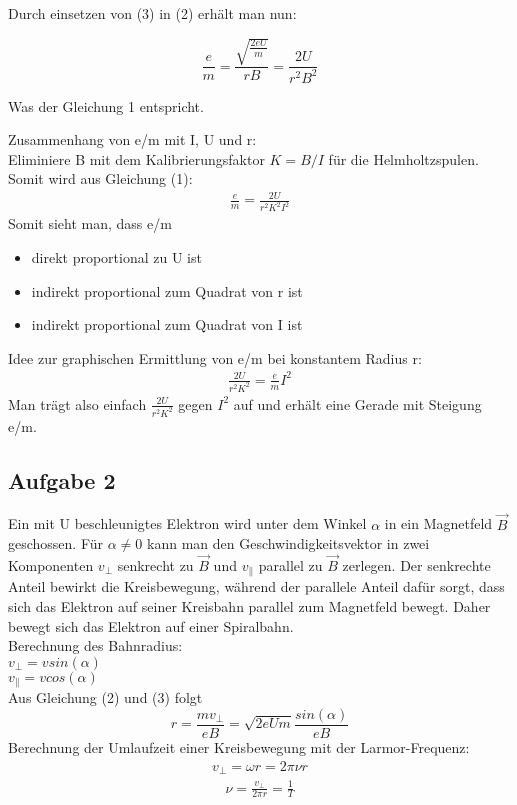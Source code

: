 \documentclass[a4paper,10pt]{scrartcl}
\begin{document}
	Durch einsetzen von (3) in (2) erhält man nun:
	
	\begin{equation}
	\frac{e}{m}=\frac{\sqrt{\frac{2eU}{m}}}{rB}=\frac{2U}{r^2B^2}
	\end{equation}
	
	Was der Gleichung 1 entspricht.
	
	\newpage
	
	Zusammenhang von e/m mit I, U und r:\\
	Eliminiere B mit dem Kalibrierungsfaktor $K=B/I$ für die Helmholtzspulen. Somit wird aus Gleichung (1):
	\begin{align}
	\frac{e}{m}=\frac{2U}{r^2K^2I^2}
	\end{align}
	Somit sieht man, dass e/m
	\begin{itemize}
		\item direkt proportional zu U ist
		\item indirekt proportional zum Quadrat von r ist
		\item indirekt proportional zum Quadrat von I ist
	\end{itemize}

	Idee zur graphischen Ermittlung von e/m bei konstantem Radius r:\\
	\begin{align*}
	\frac{2U}{r^2K^2}=\frac{e}{m}I^2
	\end{align*}
	Man trägt also einfach $\frac{2U}{r^2K^2}$ gegen $I^2$ auf und erhält eine Gerade mit Steigung e/m.
	
	\subsection{Aufgabe 2}
	
	Ein mit U beschleunigtes Elektron wird unter dem Winkel $\alpha$
	in ein Magnetfeld $\vec{B}$ geschossen. Für $\alpha\neq0$ kann man den Geschwindigkeitsvektor in zwei Komponenten $v_{\perp}$ senkrecht zu $\vec{B}$ und $v_{\parallel}$ parallel zu $\vec{B}$ zerlegen. Der senkrechte Anteil bewirkt die Kreisbewegung, während der parallele Anteil dafür sorgt, dass sich das Elektron auf seiner Kreisbahn parallel zum Magnetfeld bewegt. Daher bewegt sich das Elektron auf einer Spiralbahn.\\
	Berechnung des Bahnradius:\\
	$v_{\perp}=vsin(\alpha)$\\
	$v_{\parallel}=vcos(\alpha)$\\
	Aus Gleichung (2) und (3) folgt
	\begin{equation}
	r=\frac{mv_{\perp}}{eB}=\sqrt{2eUm}\frac{sin(\alpha)}{eB}
	\end{equation}
	Berechnung der Umlaufzeit einer Kreisbewegung mit der Larmor-Frequenz:
	\begin{align*}
	v_{\perp}=\omega r=2\pi \nu r
	\end{align*}
	\begin{align*}
	\nu=\frac{v_{\perp}}{2\pi r}=\frac{1}{T}
	\end{align*}
	
\end{document}
